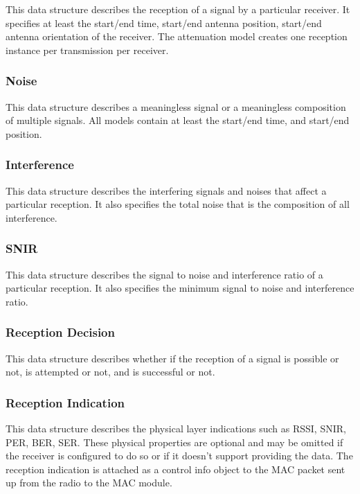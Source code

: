 This data structure describes the reception of a signal by a particular receiver.
It specifies at least the start/end time, start/end antenna position, start/end
antenna orientation of the receiver. The attenuation model creates one reception
instance per transmission per receiver.

\subsubsection{Noise}

This data structure describes a meaningless signal or a meaningless composition
of multiple signals. All models contain at least the start/end time, and
start/end position.

\subsubsection{Interference}

This data structure describes the interfering signals and noises that affect a
particular reception. It also specifies the total noise that is the composition
of all interference.

\subsubsection{SNIR}

This data structure describes the signal to noise and interference ratio of a
particular reception. It also specifies the minimum signal to noise and
interference ratio.

\subsubsection{Reception Decision}

This data structure describes whether if the reception of a signal is possible
or not, is attempted or not, and is successful or not.

\subsubsection{Reception Indication}

This data structure describes the physical layer indications such as RSSI, SNIR,
PER, BER, SER. These physical properties are optional and may be omitted if the
receiver is configured to do so or if it doesn't support providing the data. The
reception indication is attached as a control info object to the MAC packet sent
up from the radio to the MAC module. 

